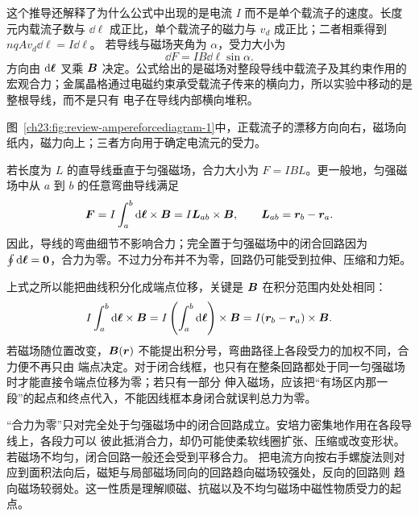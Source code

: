 {这个推导还解释了为什么公式中出现的是电流 $I$ 而不是单个载流子的速度。长度元内载流子数与
$\dd\ell$ 成正比，单个载流子的磁力与 $v_d$ 成正比；二者相乘得到 $nqAv_d\dd\ell=I\dd\ell$。
若导线与磁场夹角为 $\alpha$，受力大小为
\begin{equation}
  \dd F=IB\dd\ell\sin\alpha.
\end{equation}
方向由 $\mathop{}\!\mathrm d\bm{\ell}$ 叉乘 $\bm{B}$ 决定。公式给出的是磁场对整段导线中载流子及其约束作用的
宏观合力；金属晶格通过电磁约束承受载流子传来的横向力，所以实验中移动的是整根导线，而不是只有
电子在导线内部横向堆积。

图~\ref{ch23:fig:review-ampereforcediagram-1}中，正载流子的漂移方向向右，磁场向纸内，磁力向上；三者方向用于确定电流元的受力。
\par\noindent\begin{minipage}{\linewidth}
\ampereForceDiagram
{}
\end{minipage}\par\medskip

若长度为 $L$ 的直导线垂直于匀强磁场，合力大小为 $F=IBL$。更一般地，匀强磁场中从 $a$ 到
$b$ 的任意弯曲导线满足
\begin{equation}
  \bm{F}=I\int_a^b\mathop{}\!\mathrm d\bm{\ell}\times\bm{B}
  =I\bm{L}_{ab}\times\bm{B},
  \qquad \bm{L}_{ab}=\bm{r}_b-\bm{r}_a.
\end{equation}
因此，导线的弯曲细节不影响合力；完全置于匀强磁场中的闭合回路因为
$\oint\mathop{}\!\mathrm d\bm{\ell}=\bm{0}$，合力为零。不过力分布并不为零，回路仍可能受到拉伸、压缩和力矩。

上式之所以能把曲线积分化成端点位移，关键是 $\bm{B}$ 在积分范围内处处相同：
\begin{equation}
 I\int_a^b\mathop{}\!\mathrm d\bm{\ell}\times\bm{B}
 =I\left(\int_a^b\mathop{}\!\mathrm d\bm{\ell}\right)\times\bm{B}
 =I(\bm{r}_b-\bm{r}_a)\times\bm{B}.
\end{equation}
若磁场随位置改变，$\bm{B}(\bm{r})$ 不能提出积分号，弯曲路径上各段受力的加权不同，合力便不再只由
端点决定。对于闭合线框，也只有在整条回路都处于同一匀强磁场时才能直接令端点位移为零；若只有一部分
伸入磁场，应该把“有场区内那一段”的起点和终点代入，不能因线框本身闭合就误判总力为零。

“合力为零”只对完全处于匀强磁场中的闭合回路成立。安培力密集地作用在各段导线上，各段力可以
彼此抵消合力，却仍可能使柔软线圈扩张、压缩或改变形状。若磁场不均匀，闭合回路一般还会受到平移合力。
把电流方向按右手螺旋法则对应到面积法向后，磁矩与局部磁场同向的回路趋向磁场较强处，反向的回路则
趋向磁场较弱处。这一性质是理解顺磁、抗磁以及不均匀磁场中磁性物质受力的起点。

}
